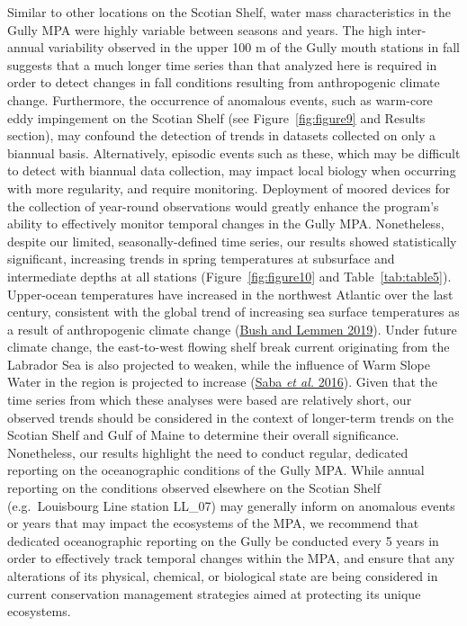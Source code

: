 \documentclass[12pt]{article}\usepackage[]{graphicx}\usepackage[]{color}
\begin{document}
Similar to other locations on the Scotian Shelf, water mass characteristics in the Gully MPA were highly variable between seasons and years. The high inter-annual variability observed in the upper 100 m of the Gully mouth stations in fall suggests that a much longer time series than that analyzed here is required in order to detect changes in fall conditions resulting from anthropogenic climate change. Furthermore, the occurrence of anomalous events, such as warm-core eddy impingement on the Scotian Shelf (see Figure~\ref{fig:figure9} and Results section), may confound the detection of trends in datasets collected on only a biannual basis. Alternatively, episodic events such as these, which may be difficult to detect with biannual data collection, may impact local biology when occurring with more regularity, and require monitoring. Deployment of moored devices for the collection of year-round observations would greatly enhance the program's ability to effectively monitor temporal changes in the Gully MPA. Nonetheless, despite our limited, seasonally-defined time series, our results showed statistically significant, increasing trends in spring temperatures at subsurface and intermediate depths at all stations (Figure~\ref{fig:figure10} and Table~\ref{tab:table5}). Upper-ocean temperatures have increased in the northwest Atlantic over the last century, consistent with the global trend of increasing sea surface temperatures as a result of anthropogenic climate change (\protect\hyperlink{ref-bush_2019}{Bush and Lemmen 2019}). Under future climate change, the east-to-west flowing shelf break current originating from the Labrador Sea is also projected to weaken, while the influence of Warm Slope Water in the region is projected to increase (\protect\hyperlink{ref-saba_2016}{Saba \textit{et al.} 2016}). Given that the time series from which these analyses were based are relatively short, our observed trends should be considered in the context of longer-term trends on the Scotian Shelf and Gulf of Maine to determine their overall significance. Nonetheless, our results highlight the need to conduct regular, dedicated reporting on the oceanographic conditions of the Gully MPA. While annual reporting on the conditions observed elsewhere on the Scotian Shelf (e.g.~Louisbourg Line station LL\_07) may generally inform on anomalous events or years that may impact the ecosystems of the MPA, we recommend that dedicated oceanographic reporting on the Gully be conducted every 5 years in order to effectively track temporal changes within the MPA, and ensure that any alterations of its physical, chemical, or biological state are being considered in current conservation management strategies aimed at protecting its unique ecosystems.
\end{document}
